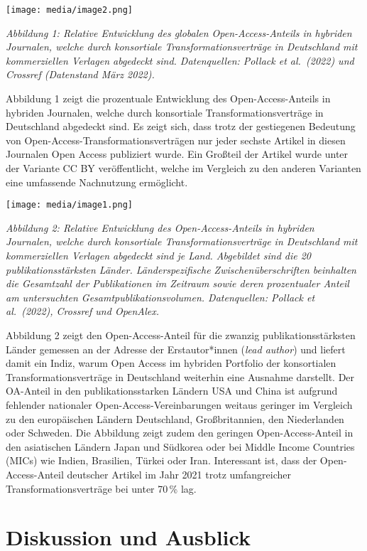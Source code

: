 \documentclass[a4paper,
fontsize=11pt,
oneside,
numbers=noperiodatend,
parskip=half-,
bibliography=totoc,
final
]{scrartcl}
\begin{document}
\texttt{[image: media/image2.png]}

\emph{Abbildung 1: Relative Entwicklung des globalen Open-Access-Anteils
in hybriden Journalen, welche durch konsortiale Transformationsverträge
in Deutschland mit kommerziellen Verlagen abgedeckt sind. Datenquellen:
Pollack et al.~(2022) und Crossref (Datenstand März 2022).}

Abbildung 1 zeigt die prozentuale Entwicklung des Open-Access-Anteils in
hybriden Journalen, welche durch konsortiale Transformationsverträge in
Deutschland abgedeckt sind. Es zeigt sich, dass trotz der gestiegenen
Bedeutung von Open-Access-Transformationsverträgen nur jeder sechste
Artikel in diesen Journalen Open Access publiziert wurde. Ein Großteil
der Artikel wurde unter der Variante CC BY veröffentlicht, welche im
Vergleich zu den anderen Varianten eine umfassende Nachnutzung
ermöglicht.

\texttt{[image: media/image1.png]}

\emph{Abbildung 2: Relative Entwicklung des Open-Access-Anteils in
hybriden Journalen, welche durch konsortiale Transformationsverträge in
Deutschland mit kommerziellen Verlagen abgedeckt sind je Land.
Abgebildet sind die 20 publikationsstärksten Länder. Länderspezifische
Zwischenüberschriften beinhalten die Gesamtzahl der Publikationen im
Zeitraum sowie deren prozentualer Anteil am untersuchten
Gesamtpublikationsvolumen. Datenquellen: Pollack et al.~(2022), Crossref
und OpenAlex.}

Abbildung 2 zeigt den Open-Access-Anteil für die zwanzig
publikationsstärksten Länder gemessen an der Adresse der Erstautor*innen
(\emph{lead author}) und liefert damit ein Indiz, warum Open Access im
hybriden Portfolio der konsortialen Transformationsverträge in
Deutschland weiterhin eine Ausnahme darstellt. Der OA-Anteil in den
publikationsstarken Ländern USA und China ist aufgrund fehlender
nationaler Open-Access-Vereinbarungen weitaus geringer im Vergleich zu
den europäischen Ländern Deutschland, Großbritannien, den Niederlanden
oder Schweden. Die Abbildung zeigt zudem den geringen Open-Access-Anteil
in den asiatischen Ländern Japan und Südkorea oder bei Middle Income
Countries (MICs) wie Indien, Brasilien, Türkei oder Iran. Interessant
ist, dass der Open-Access-Anteil deutscher Artikel im Jahr 2021 trotz
umfangreicher Transformationsverträge bei unter 70\,\% lag.

\hypertarget{diskussion-und-ausblick}{%
\section{Diskussion und Ausblick}\label{diskussion-und-ausblick}}
\end{document}
